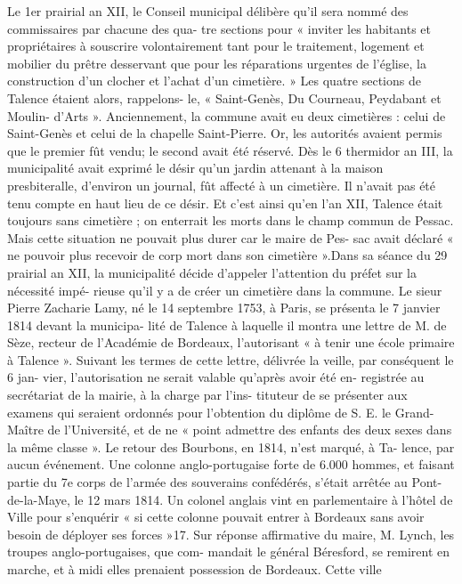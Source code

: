 \documentclass[a4paper,11pt]{book}
\begin{document}
Le 1er prairial an XII, le Conseil municipal délibère
qu'il sera nommé des commissaires par chacune des qua-
tre sections pour « inviter les habitants et propriétaires à
souscrire volontairement tant pour le traitement, logement
et mobilier du prêtre desservant que pour les réparations
urgentes de l'église, la construction d'un clocher et l'achat
d'un cimetière. »
Les quatre sections de Talence étaient alors, rappelons-
le, « Saint-Genès, Du Courneau, Peydabant et Moulin-
d'Arts ».
Anciennement, la commune avait eu deux cimetières :
celui de Saint-Genès et celui de la chapelle Saint-Pierre.
Or, les autorités avaient permis que le premier fût vendu;
le second avait été réservé.
Dès le 6 thermidor an III, la municipalité avait exprimé
le désir qu'un jardin attenant à la maison presbiteralle,
d'environ un journal, fût affecté à un cimetière. Il n'avait
pas été tenu compte en haut lieu de ce désir. Et c'est ainsi
qu'en l'an XII, Talence était toujours sans cimetière ; on
enterrait les morts dans le champ commun de Pessac. Mais
cette situation ne pouvait plus durer car le maire de Pes-
sac avait déclaré « ne pouvoir plus recevoir de corp mort
dans son cimetière ».Dans sa séance du 29 prairial an XII, la municipalité
décide d'appeler l'attention du préfet sur la nécessité impé-
rieuse qu'il y a de créer un cimetière dans la commune.
Le sieur Pierre Zacharie Lamy, né le 14 septembre 1753,
à Paris, se présenta le 7 janvier 1814 devant la municipa-
lité de Talence à laquelle il montra une lettre de M. de
Sèze, recteur de l'Académie de Bordeaux, l'autorisant « à
tenir une école primaire à Talence ». Suivant les termes
de cette lettre, délivrée la veille, par conséquent le 6 jan-
vier, l'autorisation ne serait valable qu'après avoir été en-
registrée au secrétariat de la mairie, à la charge par l'ins-
tituteur de se présenter aux examens qui seraient ordonnés
pour l'obtention du diplôme de S. E. le Grand-Maître de
l'Université, et de ne « point admettre des enfants des deux
sexes dans la même classe ».
Le retour des Bourbons, en 1814, n'est marqué, à Ta-
lence, par aucun événement. Une colonne anglo-portugaise
forte de 6.000 hommes, et faisant partie du 7e corps de
l'armée des souverains confédérés, s'était arrêtée au Pont-
de-la-Maye, le 12 mars 1814. Un colonel anglais vint
en parlementaire à l'hôtel de Ville pour s'enquérir « si
cette colonne pouvait entrer à Bordeaux sans avoir besoin
de déployer ses forces »17. Sur réponse affirmative du
maire, M. Lynch, les troupes anglo-portugaises, que com-
mandait le général Béresford, se remirent en marche, et
à midi elles prenaient possession de Bordeaux. Cette ville
\end{document}
